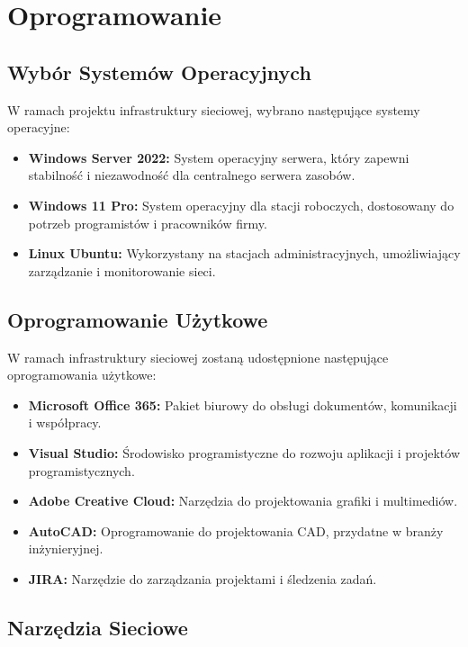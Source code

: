 \section{Oprogramowanie}

\subsection{Wybór Systemów Operacyjnych}

    W ramach projektu infrastruktury sieciowej, wybrano następujące systemy operacyjne:

    \begin{itemize}
    \item \textbf{Windows Server 2022:} System operacyjny serwera, który zapewni stabilność i niezawodność dla centralnego serwera zasobów.
    \item \textbf{Windows 11 Pro:} System operacyjny dla stacji roboczych, dostosowany do potrzeb programistów i pracowników firmy.
    \item \textbf{Linux Ubuntu:} Wykorzystany na stacjach administracyjnych, umożliwiający zarządzanie i monitorowanie sieci.
    \end{itemize}

\subsection{Oprogramowanie Użytkowe}

    W ramach infrastruktury sieciowej zostaną udostępnione następujące oprogramowania użytkowe:

    \begin{itemize}
    \item \textbf{Microsoft Office 365:} Pakiet biurowy do obsługi dokumentów, komunikacji i współpracy.
    \item \textbf{Visual Studio:} Środowisko programistyczne do rozwoju aplikacji i projektów programistycznych.
    \item \textbf{Adobe Creative Cloud:} Narzędzia do projektowania grafiki i multimediów.
    \item \textbf{AutoCAD:} Oprogramowanie do projektowania CAD, przydatne w branży inżynieryjnej.
    \item \textbf{JIRA:} Narzędzie do zarządzania projektami i śledzenia zadań.
    \end{itemize}

\subsection{Narzędzia Sieciowe}

